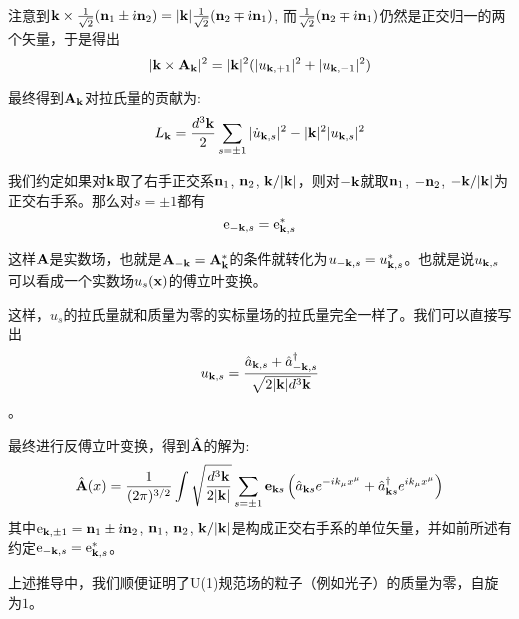 \documentclass[CJK]{beamer}
\begin{document}
\begin{frame}
\bch
注意到${\mathbf{k}} \times \frac{1}{\sqrt{2}}({\mathbf{n}}_1\pm {\dot{\imath}}{\mathbf{n}}_2) =|{\mathbf{k}}|  \frac{1}{\sqrt{2}}({\mathbf{n}}_2 \mp {\dot{\imath}} {\mathbf{n}}_1)$, 而$ \frac{1}{\sqrt{2}}({\mathbf{n}}_2 \mp {\dot{\imath}} {\mathbf{n}}_1)$仍然是正交归一的两个矢量，于是得出
$$ |{\mathbf{k}} \times {\mathbf{A}}_{\mathbf{k}}|^2 = |{\mathbf{k}}|^2(|u_{{\mathbf{k}},+1}|^2 + |u_{{\mathbf{k}},-1}|^2)$$

最终得到${\mathbf{A}}_{\mathbf{k}}$对拉氏量的贡献为:
$$ L_{\mathbf{k}} = \frac{d^3{\mathbf{k}}}{2}\sum_{s=\pm 1}  |\dot u_{{\mathbf{k}},s}|^2  - |{\mathbf{k}}|^2 |u_{{\mathbf{k}},s}|^2$$

\ech
\end{frame}


\begin{frame}
\bch

我们约定如果对${\mathbf{k}}$取了右手正交系${\mathbf{n}}_1$, ${\mathbf{n}}_2$, ${\mathbf{k}}/|{\mathbf{k}}|$，则对$-{\mathbf{k}}$就取${\mathbf{n}}_1$, $-{\mathbf{n}}_2$, $-{\mathbf{k}}/|{\mathbf{k}}|$为正交右手系。那么对$s=\pm 1$都有
$$\mathrm{e}_{-{\mathbf{k}}, s}  = \mathrm{e}_{{\mathbf{k}}, s}^*$$

这样${\mathbf{A}}$是实数场，也就是${\mathbf{A}}_{-{\mathbf{k}}} = {\mathbf{A}}_{\mathbf{k}}^*$的条件就转化为$u_{-{\mathbf{k}}, s} = u_{{\mathbf{k}}, s}^*$。也就是说$u_{{\mathbf{k}}, s}$ 可以看成一个实数场$u_s({\mathbf{x}})$的傅立叶变换。
\ech
\end{frame}

\begin{frame}
\bch

这样，$u_s$的拉氏量就和质量为零的实标量场的拉氏量完全一样了。我们可以直接写出
$$ u_{{\mathbf{k}},s} = \frac{{\hat{a}}_{{\mathbf{k}},s} + {\hat{a}^\dagger}_{-{\mathbf{k}},s}}{\sqrt{2 |{\mathbf{k}}| d^3{\mathbf{k}}}}$$。

最终进行反傅立叶变换，得到$\hat{{\mathbf{A}}}$的解为:
$$\hat{{\mathbf{A}}}(x) = \frac{1}{(2\pi)^{3/2}} \int \sqrt{\frac{d^3{\mathbf{k}}}{2|{\mathbf{k}}|}} \sum_{s=\pm 1}\mathbf{e}_{{\mathbf{k}} s}\left({\hat{a}}_{{\mathbf{k}} s} e^{-ik_\mu x^\mu} + {\hat{a}^\dagger}_{{\mathbf{k}} s}e^{ik_\mu x^\mu}\right) $$
其中$\mathrm{e}_{{\mathbf{k}},\pm 1} = {\mathbf{n}}_1 \pm {\dot{\imath}} {\mathbf{n}}_2$, ${\mathbf{n}}_1$, ${\mathbf{n}}_2$, ${\mathbf{k}}/|{\mathbf{k}}|$是构成正交右手系的单位矢量，并如前所述有约定$\mathrm{e}_{-{\mathbf{k}}, s} = \mathrm{e}_{{\mathbf{k}},s}^*$。 

\ech
\end{frame}

\begin{frame}
\bch
上述推导中，我们顺便证明了U(1)规范场的粒子（例如光子）的质量为零，自旋为$1$。
\ech
\end{frame}
\end{document}
